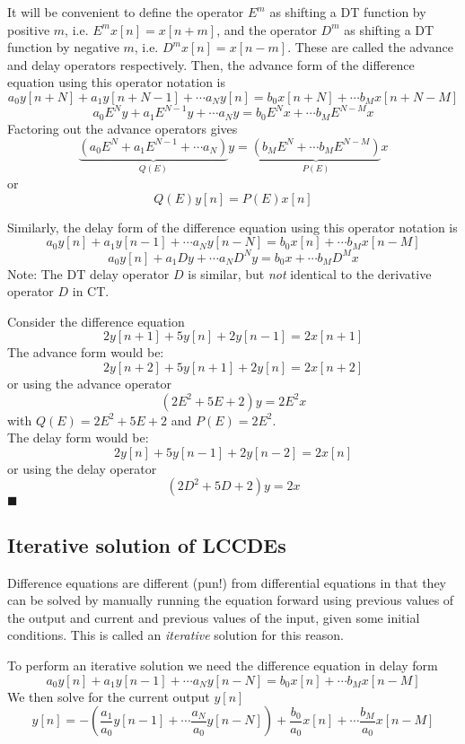It will be convenient to define the operator $E^m$ as shifting a DT function by positive $m$, i.e. $E^m x[n] = x[n+m]$, and the operator $D^m$ as shifting a DT function by negative $m$, i.e. $D^m x[n] = x[n-m]$. These are called the advance and delay operators respectively. Then, the advance form of the difference equation using this operator notation is
\[
a_0y[n+N] + a_1y[n+N-1] + \cdots a_N y[n] = b_0 x[n+N] + \cdots b_Mx[n+N-M]
\]
\[
a_0 E^Ny + a_1E^{N-1}y + \cdots a_N y = b_0 E^{N}x + \cdots b_M E^{N-M}x
\]
Factoring out the advance operators gives
\[
\underbrace{\left(a_0E^N + a_1E^{N-1} + \cdots a_N\right)}_{Q(E)} y = \underbrace{\left(b_M E^{N} + \cdots b_M E^{N-M}\right)}_{P(E)} x
\]
or
\[
Q(E)y[n] = P(E)x[n]
\]

Similarly, the delay form of the difference equation using this operator notation is
\[
a_0y[n] + a_1y[n-1] + \cdots a_N y[n-N] = b_0 x[n] + \cdots b_Mx[n-M]
\]
\[
a_0y[n] + a_1 Dy + \cdots a_N D^N y = b_0 x + \cdots b_MD^M x
\]
Note: The DT delay operator $D$ is similar, but \emph{not} identical to the derivative operator $D$ in CT.

\begin{example}
  Consider the difference equation
  \[
  2y[n+1] + 5y[n] + 2y[n-1] = 2x[n+1]
  \]
  The advance form would be:
  \[
  2y[n+2] + 5y[n+1] + 2y[n] = 2x[n+2]
  \]
  or using the advance operator
  \[
  \left(2E^2 + 5E + 2\right)y = 2E^2x
  \]
  with $Q(E) = 2E^2 + 5E + 2$ and $P(E) = 2E^2$.\\[1em]
  The delay form would be:
  \[
  2y[n] + 5y[n-1] + 2y[n-2] = 2x[n]
  \]
  or using the delay operator
  \[
  \left(2D^2 + 5D + 2\right)y = 2x
  \]
$\blacksquare$
\end{example}

\subsection{Iterative solution of LCCDEs}

Difference equations are different (pun!) from differential equations in that they can be solved by manually running the equation forward using previous values of the output and current and previous values of the input, given some initial conditions. This is called an \emph{iterative} solution for this reason.

To perform an iterative solution we need the difference equation in delay form
\[
a_0y[n] + a_1y[n-1] + \cdots a_N y[n-N] = b_0 x[n] + \cdots b_Mx[n-M]
\]
We then solve for the current output $y[n]$
\[
y[n] =  - \left(\frac{a_1}{a_0}y[n-1] + \cdots \frac{a_N}{a_0} y[n-N]\right) + \frac{b_0}{a_0} x[n] + \cdots \frac{b_M}{a_0}x[n-M]
\]


